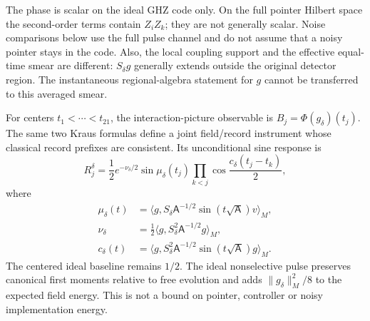 The phase is scalar on the ideal GHZ code only. On the full pointer Hilbert
space the second-order terms contain $Z_iZ_k$; they are not generally scalar.
Noise comparisons below use the full pulse channel and do not assume that a
noisy pointer stays in the code. Also, the local coupling support and the
effective equal-time smear are different: $S_\delta g$ generally extends
outside the original detector region. The instantaneous regional-algebra
statement for $g$ cannot be transferred to this averaged smear.

For centers $t_1<\cdots<t_{21}$, the interaction-picture observable is
$B_j=\Phi(g_\delta)(t_j)$. The same two Kraus formulas define a joint
field/record instrument whose classical record prefixes are consistent.
Its unconditional sine response is
\[
 R_j^\delta=\frac12e^{-\nu_\delta/2}\sin\mu_\delta(t_j)
 \prod_{k<j}\cos\frac{c_\delta(t_j-t_k)}2,
\]
where
\begin{align*}
 \mu_\delta(t)&=\langle g,S_\delta\mathsf A^{-1/2}
               \sin(t\sqrt{\mathsf A})v\rangle_M,\\
 \nu_\delta&=\tfrac12\langle g,S_\delta^2\mathsf A^{-1/2}g\rangle_M,\\
 c_\delta(t)&=\langle g,S_\delta^2\mathsf A^{-1/2}
               \sin(t\sqrt{\mathsf A})g\rangle_M.
\end{align*}
The centered ideal baseline remains $1/2$. The ideal nonselective pulse
preserves canonical first moments relative to free evolution and adds
$\|g_\delta\|_M^2/8$ to the expected field energy. This is not a bound on
pointer, controller or noisy implementation energy.

